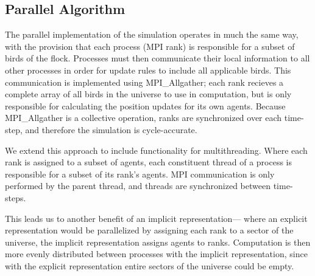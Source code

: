 \subsection*{Parallel Algorithm}
The parallel implementation of the simulation operates in much the
same way, with the provision that each process (MPI rank) is
responsible for a subset of birds of the flock. Processes must then
communicate their local information to all other processes in order
for update rules to include all applicable birds. This communication
is implemented using MPI\_Allgather; each rank recieves a complete
array of all birds in the universe to use in computation, but is only
responsible for calculating the position updates for its own agents.
Because MPI\_Allgather is a collective operation, ranks are
synchronized over each time-step, and therefore the simulation is
cycle-accurate.

We extend this approach to include functionality for
multithreading. Where each rank is assigned to a subset of agents,
each constituent thread of a process is responsible for a subset of
its rank's agents. MPI communication is only performed by the parent
thread, and threads are synchronized between time-steps.

This leads us to another benefit of an implicit representation---
where an explicit representation would be parallelized by assigning
each rank to a sector of the universe, the implicit representation
assigns agents to ranks. Computation is then more evenly distributed
between processes with the implicit representation, since with the
explicit representation entire sectors of the universe could be empty.
